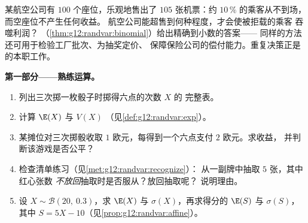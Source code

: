 \begin{problem}
\label{pb:g12:randvar:1}
某航空公司有 $100$ 个座位，乐观地售出了 $105$ 张机票：约
$10\,\%$ 的乘客从不到场，而空座位不产生任何收益。
航空公司能超售到何种程度，才会使被拒载的乘客
吞噬利润？
（\cref{thm:g12:randvar:binomial}）给出精确到小数的答案——
同样的方法还可用于检验工厂批次、为抽奖定价、
保障保险公司的偿付能力。重复决策正是
的本职工作。

\medskip
\noindent\textbf{第一部分——熟练运算。}
\begin{enumerate}
  \item 列出三次掷一枚骰子时掷得六点的次数 $X$ 的
        完整表。
  \item 计算 $\E(X)$ 与 $V(X)$
        （见\cref{def:g12:randvar:exp}）。
  \item 某摊位对三次掷骰收取 $1$ 欧元，每得到一个六点支付 $2$
        欧元。求收益，
        并判断该游戏是否公平？
  \item 检查清单练习（见\cref{met:g12:randvar:recognize}）：
        从一副牌中抽取 $5$ 张，其中红心张数
        \emph{不放回}抽取时是否服从？放回抽取呢？
        说明理由。
  \item 设 $X \sim \mathcal B(20,\ 0.3)$，求 $\E(X)$ 与
        $\sigma(X)$，再求得分的 $\E(S)$ 与 $\sigma(S)$，
        其中 $S = 5X - 10$（见\cref{prop:g12:randvar:affine}）。
\end{enumerate}


\end{problem}
